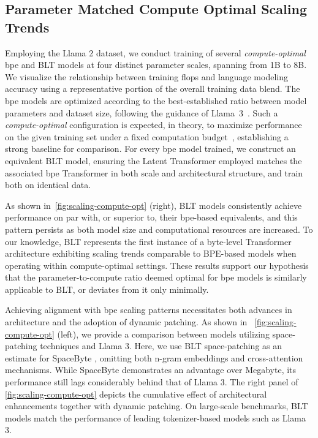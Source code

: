 \subsection{Parameter Matched Compute Optimal Scaling Trends}
\label{section:parameter-matched-scaling}
Employing the Llama 2 dataset, we conduct training of several \textit{compute-optimal} bpe and {\textsc BLT} models at four distinct parameter scales, spanning from 1B to 8B. We visualize the relationship between training flops and language modeling accuracy using a representative portion of the overall training data blend. The bpe models are optimized according to the best-established ratio between model parameters and dataset size, following the guidance of Llama~3~\citep{dubey2024llama}. Such a \textit{compute-optimal} configuration is expected, in theory, to maximize performance on the given training set under a fixed computation budget~\citep{hoffmann2022training}, establishing a strong baseline for comparison. For every bpe model trained, we construct an equivalent {\textsc BLT} model, ensuring the Latent Transformer employed matches the associated bpe Transformer in both scale and architectural structure, and train both on identical data.

As shown in~\autoref{fig:scaling-compute-opt} (right), {\textsc BLT} models consistently achieve performance on par with, or superior to, their bpe-based equivalents, and this pattern persists as both model size and computational resources are increased. To our knowledge, {\textsc BLT} represents the first instance of a byte-level Transformer architecture exhibiting scaling trends comparable to BPE-based models when operating within compute-optimal settings. These results support our hypothesis that the parameter-to-compute ratio deemed optimal for bpe models is similarly applicable to {\textsc BLT}, or deviates from it only minimally.

Achieving alignment with bpe scaling patterns necessitates both advances in architecture and the adoption of dynamic patching. As shown in ~\autoref{fig:scaling-compute-opt} (left), we provide a comparison between models utilizing space-patching techniques and Llama 3. Here, we use {\textsc BLT} space-patching as an estimate for SpaceByte \citep{slagle2024spacebyte}, omitting both n-gram embeddings and cross-attention mechanisms. While SpaceByte demonstrates an advantage over Megabyte, its performance still lags considerably behind that of Llama 3. The right panel of \autoref{fig:scaling-compute-opt} depicts the cumulative effect of architectural enhancements together with dynamic patching. On large-scale benchmarks, {\textsc BLT} models match the performance of leading tokenizer-based models such as Llama 3.

